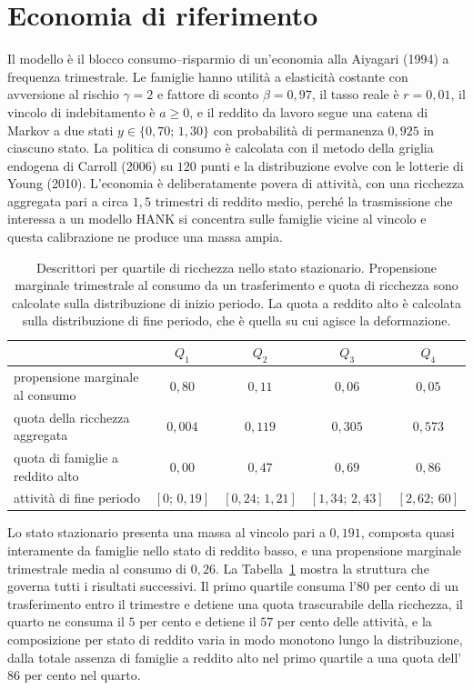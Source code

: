 \documentclass[11pt,a4paper]{article}
\begin{document}
\section{Economia di riferimento}\label{sec:economia}
Il modello è il blocco consumo--risparmio di un'economia alla Aiyagari (1994) a frequenza trimestrale. Le famiglie hanno utilità a elasticità costante con avversione al rischio $\gamma=2$ e fattore di sconto $\beta=0{,}97$, il tasso reale è $r=0{,}01$, il vincolo di indebitamento è $a\ge0$, e il reddito da lavoro segue una catena di Markov a due stati $y\in\{0{,}70;\,1{,}30\}$ con probabilità di permanenza $0{,}925$ in ciascuno stato. La politica di consumo è calcolata con il metodo della griglia endogena di Carroll (2006) su $120$ punti e la distribuzione evolve con le lotterie di Young (2010). L'economia è deliberatamente povera di attività, con una ricchezza aggregata pari a circa $1{,}5$ trimestri di reddito medio, perché la trasmissione che interessa a un modello HANK si concentra sulle famiglie vicine al vincolo e questa calibrazione ne produce una massa ampia.

\begin{table}[t]
\centering\small
\caption{Descrittori per quartile di ricchezza nello stato stazionario. Propensione marginale trimestrale al consumo da un trasferimento e quota di ricchezza sono calcolate sulla distribuzione di inizio periodo. La quota a reddito alto è calcolata sulla distribuzione di fine periodo, che è quella su cui agisce la deformazione.}
\label{tab:quartili}
\begin{tabular}{lcccc}
\toprule
 & $Q_1$ & $Q_2$ & $Q_3$ & $Q_4$\\
\midrule
propensione marginale al consumo & $0{,}80$ & $0{,}11$ & $0{,}06$ & $0{,}05$\\
quota della ricchezza aggregata & $0{,}004$ & $0{,}119$ & $0{,}305$ & $0{,}573$\\
quota di famiglie a reddito alto & $0{,}00$ & $0{,}47$ & $0{,}69$ & $0{,}86$\\
attività di fine periodo & $[0;\,0{,}19]$ & $[0{,}24;\,1{,}21]$ & $[1{,}34;\,2{,}43]$ & $[2{,}62;\,60]$\\
\bottomrule
\end{tabular}
\end{table}

Lo stato stazionario presenta una massa al vincolo pari a $0{,}191$, composta quasi interamente da famiglie nello stato di reddito basso, e una propensione marginale trimestrale media al consumo di $0{,}26$. La Tabella~\ref{tab:quartili} mostra la struttura che governa tutti i risultati successivi. Il primo quartile consuma l'$80$ per cento di un trasferimento entro il trimestre e detiene una quota trascurabile della ricchezza, il quarto ne consuma il $5$ per cento e detiene il $57$ per cento delle attività, e la composizione per stato di reddito varia in modo monotono lungo la distribuzione, dalla totale assenza di famiglie a reddito alto nel primo quartile a una quota dell'$86$ per cento nel quarto.
\end{document}
